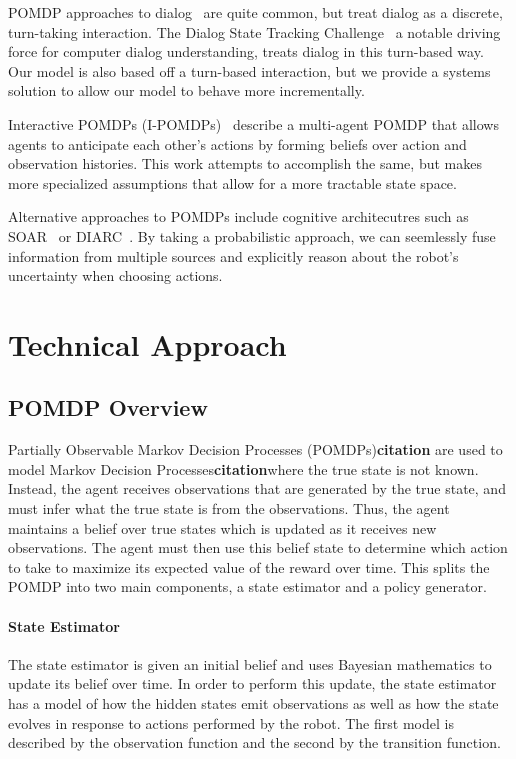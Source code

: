 \documentclass{article}
\begin{document}
POMDP approaches to dialog~\citep{young13} are quite common, but treat dialog
as a discrete, turn-taking interaction. The Dialog State Tracking
Challenge~\citep{williams2013dialog} a notable driving force for computer
dialog understanding, treats dialog in this turn-based way. Our model is also based off a turn-based interaction, but we provide a systems solution to allow our model to behave more incrementally.  

Interactive POMDPs (I-POMDPs)~\citep{gmytrasiewicz2005framework} describe a multi-agent POMDP that allows agents to anticipate each other's actions by forming beliefs over action and observation histories. This work attempts to accomplish the same, but makes more specialized assumptions that allow for a more tractable state space. 

Alternative approaches to
POMDPs include cognitive architecutres such as SOAR~\citep{soar} or
DIARC~\citep{diarc}.  By taking a probabilistic approach, we can seemlessly
fuse information from multiple sources and explicitly reason about the
robot's uncertainty when choosing actions.
\section{Technical Approach}

\subsection{POMDP Overview}

Partially Observable Markov Decision Processes (POMDPs)\textbf{citation} are used to model Markov Decision Processes\textbf{citation}where the true state is not known. Instead, the agent receives observations that are generated by the true state, and must infer what the true state is from the observations. Thus, the agent maintains a belief over true states which is updated as it receives new observations. The agent must then use this belief state to determine which action to take to maximize its expected value of the reward over time. This splits the POMDP into two main components, a state estimator and a policy generator. 

\paragraph{State Estimator}

The state estimator is given an initial belief and uses Bayesian mathematics to update its belief over time. In order to perform this update, the state estimator has a model of how the hidden states emit observations as well as how the state evolves in response to actions performed by the robot. The first model is described by the observation function and the second by the transition function. 
\end{document}
